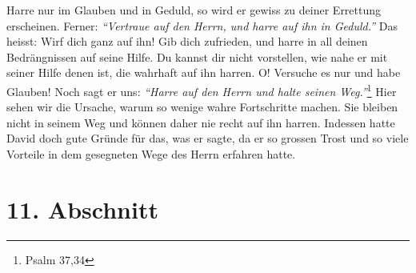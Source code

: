 Harre nur im Glauben und in Geduld, so wird er gewiss zu deiner Errettung
erscheinen. Ferner:
\textit{"`Vertraue auf den Herrn, und harre auf ihn in Geduld."'} Das
heisst: Wirf dich ganz auf ihn! Gib dich zufrieden, und harre in all deinen
Bedrängnissen auf seine Hilfe. Du kannst dir nicht vorstellen, wie nahe er mit
seiner Hilfe denen ist, die wahrhaft auf ihn harren. O! Versuche es nur und habe
Glauben! Noch sagt er uns:
\textit{"`Harre auf den Herrn und halte seinen Weg."'}\footnote{Psalm 37,34}
Hier sehen wir die Ursache, warum so wenige wahre
Fortschritte machen. Sie bleiben nicht in seinem Weg und können daher nie
recht auf ihn harren. Indessen hatte David doch gute Gründe für das, was er
sagte, da er so grossen Trost und so viele Vorteile in dem gesegneten Wege des
Herrn erfahren hatte.

\section{11. Abschnitt} \label{kap6_ab11}

